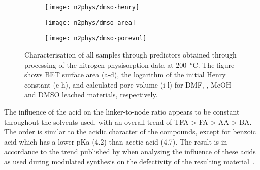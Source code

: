 \begin{figure}[p]
    \begin{subfigure}{0.33\linewidth}
		\parbox[c]{0.12\linewidth}{\caption{}%
			\label{def:fig:n2phys-dmso-henry}}%
		\parbox[b]{0.88\linewidth}{%
			\texttt{[image: n2phys/dmso-henry]}%
		}%
    \end{subfigure}%
    \begin{subfigure}{0.33\linewidth}
		\parbox[c]{0.12\linewidth}{\caption{}%
			\label{def:fig:n2phys-dmso-area}}%
		\parbox[b]{0.88\linewidth}{%
			\texttt{[image: n2phys/dmso-area]}%
		}%
    \end{subfigure}%
    \begin{subfigure}{0.33\linewidth}
		\parbox[c]{0.12\linewidth}{\caption{}%
			\label{def:fig:n2phys-dmso-porevol}}%
		\parbox[b]{0.88\linewidth}{%
			\texttt{[image: n2phys/dmso-porevol]}%
		}%
    \end{subfigure}%

    \caption{Characterisation of all samples through predictors
    obtained through processing of the nitrogen physisorption 
    data at \SI{200}{\degreeCelsius}. The figure shows \gls{BET} surface
    area (a-d), the logarithm of the initial Henry constant (e-h), 
    and calculated pore volume (i-l) for \gls{DMF}, , \gls{MeOH} and 
    \gls{DMSO} leached materials, respectively.}%
    \label{def:fig:nitrogen-predictors}
    
\end{figure}

The influence of the acid on the linker-to-node ratio appears to be
constant throughout the solvents used, with an overall trend of 
\gls{TFA} > \gls{FA} > \gls{AA} > \gls{BA}. The order is similar
to the acidic character of the compounds, except for
benzoic acid which has a lower pKa (4.2) than acetic acid (4.7).
The result is in accordance to the trend published by 
\citeauthor{shearerDefectEngineeringTuning2016} when analysing
the influence of these acids as used during modulated synthesis on the
defectivity of the resulting material~\cite{shearerDefectEngineeringTuning2016}.

